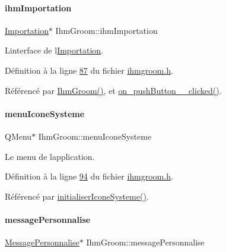 \paragraph{\texorpdfstring{ihm\+Importation}{ihmImportation}}
{\footnotesize\ttfamily \hyperlink{class_importation}{Importation}$\ast$ Ihm\+Groom\+::ihm\+Importation\hspace{0.3cm}{\ttfamily [private]}}



L\textquotesingle{}interface de l\textquotesingle{}\hyperlink{class_importation}{Importation}. 



Définition à la ligne \hyperlink{ihmgroom_8h_source_l00087}{87} du fichier \hyperlink{ihmgroom_8h_source}{ihmgroom.\+h}.



Référencé par \hyperlink{ihmgroom_8cpp_source_l00031}{Ihm\+Groom()}, et \hyperlink{ihmgroom_8cpp_source_l00186}{on\+\_\+push\+Button\+\_\+\_\+clicked()}.

\mbox{\label{class_ihm_groom_af2abf22a1a9203af547f32c7edb13710}} 
\paragraph{\texorpdfstring{menu\+Icone\+Systeme}{menuIconeSysteme}}
{\footnotesize\ttfamily Q\+Menu$\ast$ Ihm\+Groom\+::menu\+Icone\+Systeme\hspace{0.3cm}{\ttfamily [private]}}



Le menu de l\textquotesingle{}application. 



Définition à la ligne \hyperlink{ihmgroom_8h_source_l00094}{94} du fichier \hyperlink{ihmgroom_8h_source}{ihmgroom.\+h}.



Référencé par \hyperlink{ihmgroom_8cpp_source_l00106}{initialiser\+Icone\+Systeme()}.

\mbox{\label{class_ihm_groom_a529729b93d7b8d17147d3b47fe9a274d}} 
\paragraph{\texorpdfstring{message\+Personnalise}{messagePersonnalise}}
{\footnotesize\ttfamily \hyperlink{class_message_personnalise}{Message\+Personnalise}$\ast$ Ihm\+Groom\+::message\+Personnalise\hspace{0.3cm}{\ttfamily [private]}}



